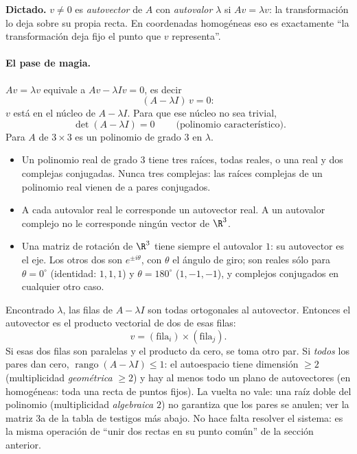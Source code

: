 {\small\vspace{1mm}\par}


\textbf{Dictado.} \(v\neq0\) es \emph{autovector} de \(A\) con \emph{autovalor}
\(\lambda\) si \(Av=\lambda v\): la transformación lo deja sobre su propia recta. En
coordenadas homogéneas eso es exactamente ``la transformación deja fijo el punto que \(v\)
representa''.

\paragraph{El pase de magia.} \(Av=\lambda v\) equivale a \(Av-\lambda Iv=0\), es decir
\[
  (A-\lambda I)\,v=0 :
\]
\(v\) está en el núcleo de \(A-\lambda I\). Para que ese núcleo no sea trivial,
\[
  \boxed{\ \det(A-\lambda I)=0\ }\qquad\text{(polinomio característico)} .
\]
Para \(A\) de \(3\times3\) es un polinomio de grado \(3\) en \(\lambda\).

\begin{resultado}
\begin{itemize}
  \item Un polinomio real de grado \(3\) tiene tres raíces, todas reales, o una real y dos
  complejas conjugadas. Nunca tres complejas: las raíces complejas de un polinomio real
  vienen de a pares conjugados.
  \item A cada autovalor real le corresponde un autovector real. A un autovalor complejo no
  le corresponde ningún vector de \(\R^3\).
  \item Una matriz de rotación de \(\R^3\) tiene siempre el autovalor \(1\): su autovector es
  el eje. Los otros dos son \(e^{\pm i\theta}\), con \(\theta\) el ángulo de giro; son reales
  sólo para \(\theta=0^\circ\) (identidad: \(1,1,1\)) y \(\theta=180^\circ\) (\(1,-1,-1\)),
  y complejos conjugados en cualquier otro caso.
\end{itemize}
\end{resultado}

\begin{idea}
Encontrado \(\lambda\), las filas de \(A-\lambda I\) son todas ortogonales al autovector.
Entonces el autovector es el producto vectorial de dos de esas filas:
\[
  v=(\text{fila}_i)\times(\text{fila}_j) .
\]
Si esas dos filas son paralelas y el producto da cero, se toma otro par. Si \emph{todos} los
pares dan cero, \(\operatorname{rango}(A-\lambda I)\le1\): el autoespacio tiene dimensión
\(\ge2\) (multiplicidad \emph{geométrica} \(\ge2\)) y hay al menos todo un plano de
autovectores (en homogéneas: toda una recta de puntos fijos). La vuelta no vale: una raíz
doble del polinomio (multiplicidad \emph{algebraica} \(2\)) no garantiza que los pares se
anulen; ver la matriz 3a de la tabla de testigos más abajo. No hace falta resolver el sistema: es la
misma operación de ``unir dos rectas en su punto común'' de la sección anterior.
\end{idea}

